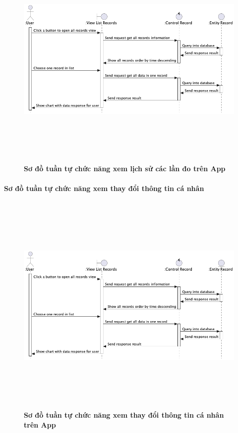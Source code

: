 \documentclass{article}%
\begin{document}
    \begin{figure}[H]
         \centering
         \includegraphics[width=16cm,height=11cm]{Images/mobile_app/view_record_timeline.png}
         \caption[Sơ đồ tuần tự chức năng xem lịch sử các lần đo trên App]{\bfseries \fontsize{12pt}{0pt}
         \selectfont Sơ đồ tuần tự chức năng xem lịch sử các lần đo trên App}
         \label{hinh21} %
    \end{figure}

\paragraph{Sơ đồ tuần tự chức năng xem thay đổi thông tin cá nhân}
\mbox{}

  \begin{figure}[H]
        \centering
        \includegraphics[width=16cm,height=11cm]{Images/mobile_app/view_record_timeline.png}
        \caption[Sơ đồ tuần tự chức năng xem thay đổi thông tin cá nhân trên App]{\bfseries \fontsize{12pt}{0pt}
        \selectfont Sơ đồ tuần tự chức năng xem thay đổi thông tin cá nhân trên App}
        \label{hinh21} %
  \end{figure}
\end{document}
